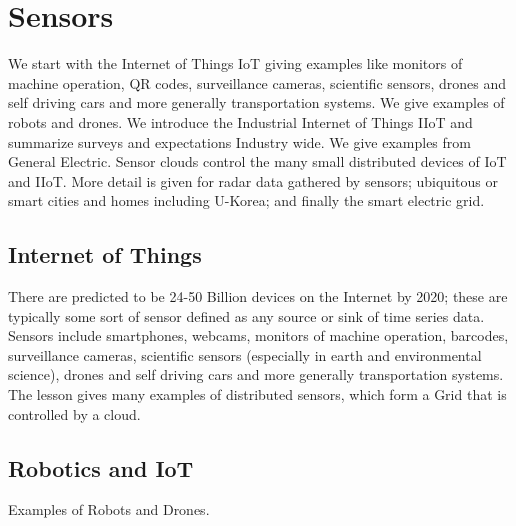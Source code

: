 

\chapter{Sensors}

\FILENAME

We start with the Internet of Things IoT giving examples like monitors
of machine operation, QR codes, surveillance cameras, scientific
sensors, drones and self driving cars and more generally
transportation systems. We give examples of robots and drones. We
introduce the Industrial Internet of Things IIoT and summarize surveys
and expectations Industry wide. We give examples from General
Electric.  Sensor clouds control the many small distributed devices of
IoT and IIoT. More detail is given for radar data gathered by sensors;
ubiquitous or smart cities and homes including U-Korea; and finally
the smart electric grid.




\section{Internet of Things}\label{internet-of-things}

There are predicted to be 24-50 Billion devices on the Internet by 2020;
these are typically some sort of sensor defined as any source or sink of
time series data. Sensors include smartphones, webcams, monitors of
machine operation, barcodes, surveillance cameras, scientific sensors
(especially in earth and environmental science), drones and self driving
cars and more generally transportation systems. The lesson gives many
examples of distributed sensors, which form a Grid that is controlled by
a cloud.



\section{Robotics and IoT}

Examples of Robots and Drones.



